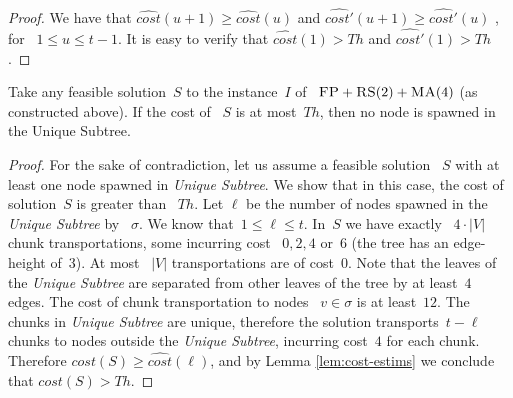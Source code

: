 \documentclass[preprint,12pt]{elsarticle}
\newcommand{\FP}{\textsc{FP}}
\newcommand{\RS}{\textsc{RS}}
\newcommand{\MA}{\textsc{MA}}
\newcommand{\Solution}{S}
\newcommand{\CostSol}{\textit{cost}(\Solution)}
\newcommand{\CostEstimOne}{\widehat{cost}}
\newcommand{\CostEstimTwo}{\widehat{cost'}}
\newcommand{\numNodes}{\ensuremath{|V|}}
\newcommand{\UnqSubtree}{{{\emph{Unique Subtree}}}}
\newcommand{\SpawnedUnqSubtree}{\sigma}
\newcommand{\Thr}{\ensuremath{Th}}
\begin{document}
\begin{proof}
  We have that $\CostEstimOne(u+1) \geq \CostEstimOne(u)$ and $\CostEstimTwo(u+1) \geq \CostEstimTwo(u)$ , for
 ~$1\leq u \leq t-1$. It is easy to verify that $\CostEstimOne(1) > \Thr$ and $\CostEstimTwo(1) > \Thr$.
\end{proof}

\begin{lemma}
  Take any feasible solution~$\Solution$ to the instance~$I$ of
 ~$\FP+\RS(2)+\MA(4)$ (as constructed above). If the cost of
 ~$\Solution$ is at most~$\Thr$, then no node is spawned in the Unique
  Subtree.
  \label{th:no-unique}
\end{lemma}

\begin{proof}
  For the sake of contradiction, let us assume a feasible solution
 ~$\Solution$ with at least one node spawned in {\UnqSubtree}. We show
  that in this case, the cost of solution~$\Solution$ is greater than
 ~$\Thr$. Let $\ell$ be the number of nodes spawned in the {\UnqSubtree} by
 ~$\SpawnedUnqSubtree$. We know
  that~$1 \leq \ell \leq t$.  In~$\Solution$ we have exactly
 ~$4 \cdot \numNodes$ chunk transportations, some incurring cost
 ~$0, 2, 4$ or~$6$ (the tree has an edge-height of~$3$). At most
 ~$\numNodes$ transportations are of cost~$0$. Note that the leaves of the
  {\UnqSubtree} are separated from other leaves of the tree by at
  least~$4$ edges.  The cost of chunk transportation to nodes
 ~$v \in \SpawnedUnqSubtree$ is at least~$12$. The chunks in
  {\UnqSubtree} are unique, therefore the solution transports~$t - \ell$
  chunks to nodes outside the \UnqSubtree, incurring cost~$4$ for each
  chunk.
  Therefore $\CostSol \geq \CostEstimOne(\ell)$, and by Lemma \ref{lem:cost-estims}
  we conclude that $\CostSol > \Thr$.
\end{proof}
\end{document}

